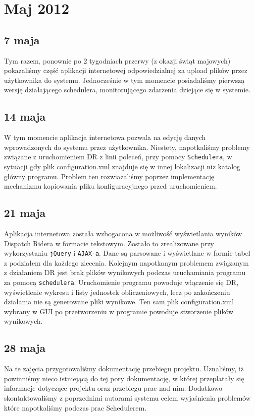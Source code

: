 \section{Maj 2012}
\subsection{7 maja}
Tym razem, ponownie po 2 tygodniach przerwy (z okazji świąt majowych) pokazaliśmy część aplikacji internetowej odpowiedzialnej za 
upload plików przez użytkownika do systemu. Jednocześnie w tym momencie posiadaliśmy pierwszą wersję działającego schedulera, monitorującego
zdarzenia dziejące się w systemie.

\subsection{14 maja}
W tym momencie aplikacja internetowa pozwala na edycję danych wprowadzonych do systemu przez użytkownika. 
Niestety, napotkaliśmy problemy związane z uruchomieniem DR z linii poleceń, przy pomocy \texttt{Schedulera}, w sytuacji gdy plik configuration.xml znajduje się w innej lokalizacji niz katalog główny programu. Problem ten rozwiazaliśmy poprzez implementację mechanizmu kopiowania pliku konfiguracyjnego przed uruchomieniem.

\subsection{21 maja}
Aplikacja internetowa została wzbogacona w możliwość wyświetlania wyników Dispatch Ridera w formacie tekstowym.
Zostało to zrealizowane przy wykorzystaniu \texttt{jQuery} i  \texttt{AJAX-a}. Dane są parsowane i wyświetlane w formie tabel
z podziałem dla każdego zlecenia. Kolejnym napotkanym problemem związanym z działaniem DR jest brak plików wynikowych podczas uruchamiania programu za pomocą \texttt{schedulera}. Uruchomienie programu powoduje włączenie się DR, wyświetlenie wykresu i listy jednostek obliczeniowych, lecz po zakończeniu działania nie są generowane pliki wynikowe. Ten sam plik configuration.xml wybrany w GUI po przetworzeniu w programie powoduje stworzenie plików wynikowych. 

\subsection{28 maja}
Na te zajęcia przygotowaliśmy dokumentację przebiegu projektu. Uznaliśmy, iż powinniśmy nieco  istniejącą do tej pory dokumentację,
w której przeplatały się informacje dotyczące projektu oraz przebiegu prac nad nim. Dodatkowo skontaktowaliśmy z poprzednimi
autorami systemu celem wyjaśnienia problemów które napotkaliśmy podczas prac Schedulerem.